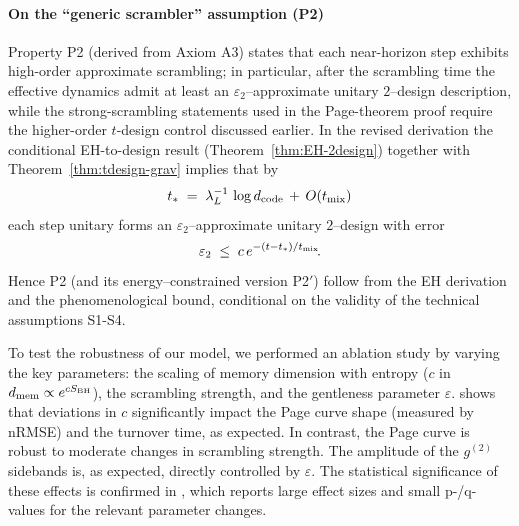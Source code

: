 \documentclass[a4paper,11pt]{article}
\theoremstyle{plain}
\theoremstyle{definition}
\theoremstyle{remark}
\newcommand{\datatableAblation}{}
\begin{document}
\paragraph{On the ``generic scrambler'' assumption (P2)}
Property P2 (derived from Axiom A3) states that each near-horizon step exhibits high-order approximate scrambling; in particular, after the scrambling time the effective dynamics admit at least an $\varepsilon_2$--approximate unitary $2$--design description, while the strong-scrambling statements used in the Page-theorem proof require the higher-order $t$-design control discussed earlier.
In the revised derivation the conditional EH-to-design result (Theorem~\ref{thm:EH-2design}) together with Theorem~\ref{thm:tdesign-grav} implies that by
\[
t_\ast \;=\; \lambda_L^{-1}\,\log d_{\rm code} \,+\, O(t_{\rm mix})
\]
each step unitary forms an $\varepsilon_2$--approximate unitary $2$--design with error
\[
\varepsilon_2 \;\le\; c\,e^{-(t-t_\ast)/t_{\rm mix}}\!.
\]
Hence P2 (and its energy--constrained version P2$'$) follow from the EH derivation and the phenomenological bound, conditional on the validity of the technical assumptions S1-S4.

To test the robustness of our model, we performed an ablation study by varying the key parameters: the scaling of memory dimension with entropy ($c$ in $d_{\rm mem} \propto e^{c S_{\rm BH}}$), the scrambling strength, and the gentleness parameter $\varepsilon$.  shows that deviations in $c$ significantly impact the Page curve shape (measured by nRMSE) and the turnover time, as expected. In contrast, the Page curve is robust to moderate changes in scrambling strength. The amplitude of the $g^{(2)}$ sidebands is, as expected, directly controlled by $\varepsilon$. The statistical significance of these effects is confirmed in , which reports large effect sizes and small p-/q-values for the relevant parameter changes.

\begin{table}[htbp]
\centering
\caption{Ablation study results (mean values over runs). Metrics include residual final entropy, normalized RMSE (nRMSE, defined in ) to the ideal Page envelope, turnover step, and maximum $g^{(2)}$ amplitude.}
\label{tab:ablation}
\vspace{0.5em}
\footnotesize
\setlength{\tabcolsep}{4pt}
\pgfplotstabletypeset{\datatableAblation}
\vspace{0.5em}
\end{table}
\end{document}

